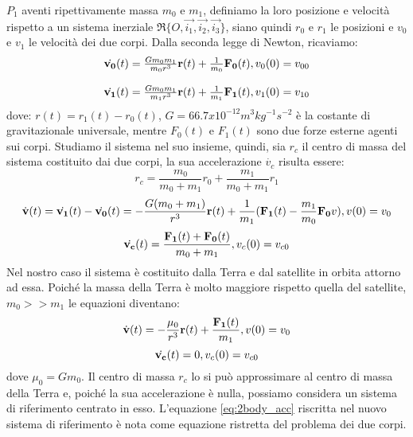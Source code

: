$P_1$ aventi ripettivamente massa $m_0$ e $m_1$, definiamo la loro posizione e
velocità rispetto a un sistema inerziale $\mathfrak{R} \{
O,\vec{i_1},\vec{i_2},\vec{i_3}\}$, siano quindi $r_0$ e $r_1$ le posizioni e
$v_0$ e $v_1$ le velocità dei due corpi. Dalla seconda legge di Newton,
ricaviamo:
\begin{equation}
\begin{array}{l}
\dot{\bf v_0}(t)=\frac{Gm_0m_1}{m_0r^3}{\bf r}(t) +
\frac{1}{m_0}{\bf F_0}(t),v_0(0)=v_{00}\\\\
\dot{\bf v_1}(t)=\frac{Gm_0m_1}{m_1r^3}{\bf r}(t) +
\frac{1}{m_1}{\bf F_1}(t),v_1(0)=v_{10}
\end{array}
\end{equation}
dove: $r(t)=r_1(t)-r_0(t)$, $G=66.7x10^{-12} m^3kg^{-1}s^{-2}$ è la costante di
gravitazionale universale, mentre $F_0(t)$ e $F_1(t)$ sono due forze esterne
agenti sui corpi.
Studiamo il sistema nel suo insieme, quindi, sia $r_c$ il centro di massa del
sistema costituito dai due corpi, la sua accelerazione $\dot{v_c}$ risulta essere:
\[r_c=\frac{m_0}{m_0+m_1}r_0+\frac{m_1}{m_0+m_1}r_1\]
\begin{equation}
\dot{\bf v}(t)=\dot{\bf v_1}(t)-\dot{\bf v_0}(t)=-\frac{G(m_0+m_1)}{r^3}{\bf
r}(t)+\frac{1}{m_1}({\bf F_1}(t)-\frac{m_1}{m_0}{\bf F_0}v), v(0)=v_0
\end{equation}
\begin{equation}
\dot{\bf v_c}(t)=\frac{{\bf F_1}(t)+{\bf F_0}(t)}{m_0+m_1},v_c(0)=v_{c0}
\end{equation}
Nel nostro caso il sistema è costituito dalla Terra e dal satellite in orbita
attorno ad essa. Poiché la massa della Terra è molto maggiore rispetto quella
del satellite, $m_0>>m_1$ le equazioni diventano:
\begin{equation}
\dot{\bf v}(t)=-\frac{\mu_0}{r^3}{\bf r}(t)+\frac{{\bf F_1}(t)}{m_1}, v(0)=v_0
\label{eq:2body_acc}
\end{equation}
\begin{equation}
\dot{\bf v_c}(t)=0, v_c(0)=v_{c0}
\end{equation}
dove $\mu_0=Gm_0$.
Il centro di massa $r_c$ lo si può approssimare al centro di massa della Terra
e, poiché la sua accelerazione è nulla, possiamo considera un sistema di
riferimento centrato in esso. L'equazione \ref{eq:2body_acc} riscritta
nel nuovo sistema di riferimento è nota come equazione ristretta del problema
dei due corpi.
